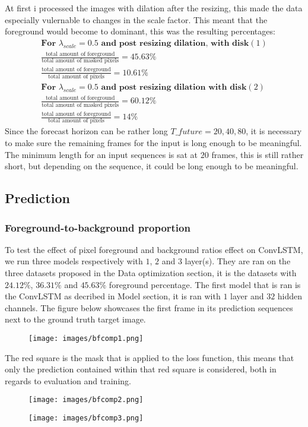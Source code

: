 \documentclass[a4paper,12pt]{article}
\begin{document}
At first i processed the images with dilation after the resizing, this made the data especially vulernable to changes in the scale factor. This meant that the foreground would become to dominant, this was the resulting percentages:
\begin{align*}
  \textbf{For $\lambda_{scale} = 0.5$ and post resizing dilation, with disk$(1)$}\\
  \frac{\text{total amount of foreground}}{\text{total amount of masked pixels}} = 45.63\%\\ 
  \frac{\text{total amount of foreground}}{\text{total amount of pixels}} = 10.61\%\\
  \textbf{For $\lambda_{scale} = 0.5$ and post resizing dilation with disk$(2)$}\\
  \frac{\text{total amount of foreground}}{\text{total amount of masked pixels}} = 60.12\%\\ 
  \frac{\text{total amount of foreground}}{\text{total amount of pixels}} = 14\%
\end{align*}
Since the forecast horizon can be rather long $T\_future = 20, 40, 80$, it is necessary to make sure the remaining frames for the input is long enough to be meaningful. The minimum length for an input sequences is sat at $20$ frames, this is still rather short, but depending on the sequence, it could be long enough to be meaningful.
\subsection{Prediction}
\subsubsection{Foreground-to-background proportion}
To test the effect of pixel foreground and background ratios effect on ConvLSTM, we run three models respectively with $1$, $2$ and $3$ layer(s). They are ran on the three datasets proposed in the Data optimization section, it is the datasets with $24.12\%$, $36.31\%$ and $45.63\%$ foreground percentage.
The first model that is ran is the ConvLSTM as decribed in Model section, it is ran with $1$ layer and $32$ hidden channels. The figure below showcases the first frame in its prediction sequences next to the ground truth target image.
\begin{figure}[H]
  \centering
  \texttt{[image: images/bfcomp1.png]}
  \caption{} %
  \label{fig:n14}
\end{figure}
The red square is the mask that is applied to the loss function, this means that only the prediction contained within that red square is considered, both in regards to evaluation and training. 
\begin{figure}[H]
  \centering
  \texttt{[image: images/bfcomp2.png]}
  \caption{} %
  \label{fig:n15}
\end{figure}
\begin{figure}[H]
  \centering
  \texttt{[image: images/bfcomp3.png]}
  \caption{} %
  \label{fig:n16}
\end{figure}
\end{document}
